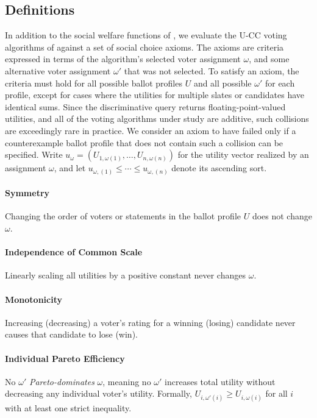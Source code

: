 \documentclass[letterpaper]{article} %
\begin{document}
\subsection{Definitions}
\label{app:axiom-definitions}

In addition to the social welfare functions of , we evaluate the \textsc{U-CC} voting algorithms of  against a set of social choice axioms.
The axioms are criteria expressed in terms of the algorithm's selected voter assignment $\omega$, and some alternative voter assignment $\omega'$ that was not selected.
To satisfy an axiom, the criteria must hold for all possible ballot profiles $U$ and all possible $\omega'$ for each profile, except for cases where the utilities for multiple slates or candidates have identical sums.
Since the discriminative query returns floating-point-valued utilities, and all of the voting algorithms under study are additive, such collisions are exceedingly rare in practice.
We consider an axiom to have failed only if a counterexample ballot profile that does not contain such a collision can be specified.
Write $u_\omega=(U_{1,\omega(1)},\ldots,U_{n,\omega(n)})$ for the utility vector realized by an assignment $\omega$, and let $u_{\omega,(1)}\le\cdots\le u_{\omega,(n)}$ denote its ascending sort.

\paragraph{Symmetry}
Changing the order of voters or statements in the ballot profile $U$ does not change $\omega$.

\paragraph{Independence of Common Scale}
Linearly scaling all utilities by a positive constant never changes $\omega$.

\paragraph{Monotonicity}
Increasing (decreasing) a voter’s rating for a winning (losing) candidate never causes that candidate to lose (win).

\paragraph{Individual Pareto Efficiency}
No $\omega'$ \emph{Pareto-dominates} $\omega$, meaning no $\omega'$ increases total utility without decreasing any individual voter's utility.
Formally, $U_{i,\omega'(i)}\ge U_{i,\omega(i)}$ for all $i$ with at least one strict inequality.
\end{document}
